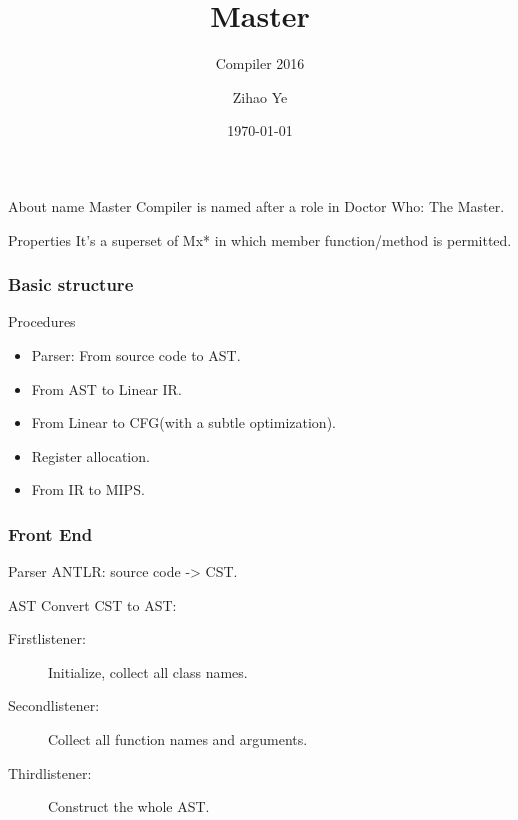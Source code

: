 \documentclass{beamer}
\begin{document}
	\begin{frame}[containsverbatim]
		\title{Master}
		\subtitle{Compiler 2016}
		\author{Zihao Ye}
		\date{\today}
		\titlepage
	\end{frame}
	
	\begin{frame}
		\begin{block}{About name}
		Master Compiler is named after a role in Doctor Who: The Master.
		\end{block}
		\begin{block}{Properties}
		It's a superset of Mx* in which member function/method is permitted.
		\end{block}
	\end{frame}

	\begin{frame}
		\frametitle{Basic structure}
		\begin{block}{Procedures}
		\begin{itemize}
			\item
			Parser: From source code to AST.
			\item
			From AST to Linear IR.
			\item
			From Linear to CFG(with a subtle optimization).
			\item
			Register allocation.
			\item
			From IR to MIPS.
		\end{itemize}
		\end{block}
	\end{frame}

	\begin{frame}
		\frametitle{Front End}
		\begin{block}{Parser}
		ANTLR: source code -> CST.
		\end{block}
		\begin{alertblock}{AST}
		Convert CST to AST:
			\begin{description}
				\item[Firstlistener:]

				Initialize, collect all class names.
				\item[Secondlistener:]

				Collect all function names and arguments.							
				\item[Thirdlistener:]

				Construct the whole AST.
			\end{description}
		\end{alertblock}
	\end{frame}
\end{document}
